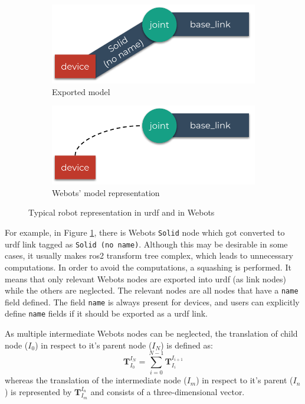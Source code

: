 \begin{figure}[H]
\centering
\begin{subfigure}{\textwidth}
  \centering
  \includegraphics[width=.7\linewidth]{generalization/figures/squashing_transforms_actual.pdf}
  \caption{Exported model}
  \label{fig:generalization:squashing_transforms:actual}
\end{subfigure}
\begin{subfigure}{\textwidth}
  \centering
  \includegraphics[width=.7\linewidth]{generalization/figures/squashing_transforms_desired.pdf}
  \caption{Webots' model representation}
  \label{fig:generalization:squashing_transforms:desired}
\end{subfigure}
\caption{Typical robot representation in \ac{urdf} and in Webots}
\label{fig:generalization:squashing_transforms}
\end{figure}

For example, in Figure \ref{fig:generalization:squashing_transforms:actual}, there is Webots \texttt{Solid} node which got converted to \ac{urdf} link tagged as \texttt{Solid (no name)}. 
Although this may be desirable in some cases, it usually makes \ac{ros2} transform tree complex, which leads to unnecessary computations.
In order to avoid the computations, a squashing is performed.
It means that only relevant Webots nodes are exported into \ac{urdf} (as link nodes) while the others are neglected.
The relevant nodes are all nodes that have a \texttt{name} field defined.
The field \texttt{name} is always present for devices, and users can explicitly define \texttt{name} fields if it should be exported as a \ac{urdf} link.

As multiple intermediate Webots nodes can be neglected, the translation of child node ($I_0$) in respect to it's parent node ($I_N$) is defined as:
\begin{equation}
    \bm{T}_{I_0}^{I_N} = \sum_{i=0}^{N-1} \bm{T}_{I_i}^{I_{i+1}}
\end{equation}
whereas the translation of the intermediate node ($I_m$) in respect to it's parent ($I_n$) is represented by $ \bm{T}_{I_m}^{I_n} $ and consists of a three-dimensional vector.

